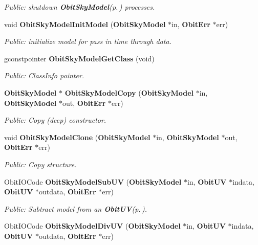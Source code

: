 \begin{CompactItemize}
\begin{CompactList}\small\item\em Public: shutdown {\bf Obit\-Sky\-Model}{\rm (p.\,\pageref{structObitSkyModel})} processes. \item\end{CompactList}\item 
void {\bf Obit\-Sky\-Model\-Init\-Model} ({\bf Obit\-Sky\-Model} $\ast$in, {\bf Obit\-Err} $\ast$err)
\begin{CompactList}\small\item\em Public: initialize model for pass in time through data. \item\end{CompactList}\item 
gconstpointer {\bf Obit\-Sky\-Model\-Get\-Class} (void)
\begin{CompactList}\small\item\em Public: Class\-Info pointer. \item\end{CompactList}\item 
{\bf Obit\-Sky\-Model} $\ast$ {\bf Obit\-Sky\-Model\-Copy} ({\bf Obit\-Sky\-Model} $\ast$in, {\bf Obit\-Sky\-Model} $\ast$out, {\bf Obit\-Err} $\ast$err)
\begin{CompactList}\small\item\em Public: Copy (deep) constructor. \item\end{CompactList}\item 
void {\bf Obit\-Sky\-Model\-Clone} ({\bf Obit\-Sky\-Model} $\ast$in, {\bf Obit\-Sky\-Model} $\ast$out, {\bf Obit\-Err} $\ast$err)
\begin{CompactList}\small\item\em Public: Copy structure. \item\end{CompactList}\item 
Obit\-IOCode {\bf Obit\-Sky\-Model\-Sub\-UV} ({\bf Obit\-Sky\-Model} $\ast$in, {\bf Obit\-UV} $\ast$indata, {\bf Obit\-UV} $\ast$outdata, {\bf Obit\-Err} $\ast$err)
\begin{CompactList}\small\item\em Public: Subtract model from an {\bf Obit\-UV}{\rm (p.\,\pageref{structObitUV})}. \item\end{CompactList}\item 
Obit\-IOCode {\bf Obit\-Sky\-Model\-Div\-UV} ({\bf Obit\-Sky\-Model} $\ast$in, {\bf Obit\-UV} $\ast$indata, {\bf Obit\-UV} $\ast$outdata, {\bf Obit\-Err} $\ast$err)

\end{CompactItemize}
